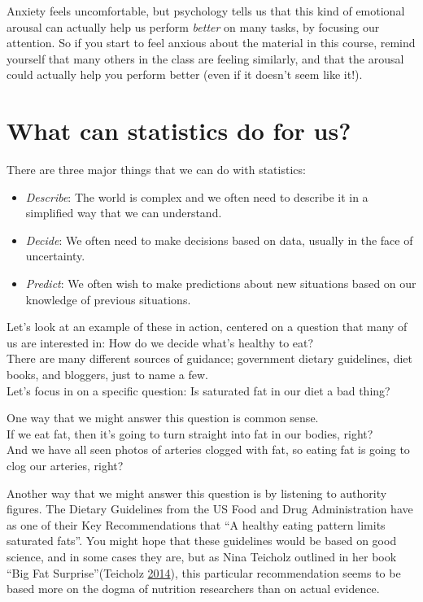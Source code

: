 \documentclass[12pt,]{book}
\providecommand{\tightlist}{%
  \setlength{\itemsep}{0pt}\setlength{\parskip}{0pt}}
\theoremstyle{definition}
\theoremstyle{definition}
\theoremstyle{definition}
\theoremstyle{remark}
\begin{document}
Anxiety feels uncomfortable, but psychology tells us that this kind of emotional arousal can actually help us perform \emph{better} on many tasks, by focusing our attention. So if you start to feel anxious about the material in this course, remind yourself that many others in the class are feeling similarly, and that the arousal could actually help you perform better (even if it doesn't seem like it!).

\hypertarget{what-can-statistics-do-for-us}{%
\section{What can statistics do for us?}\label{what-can-statistics-do-for-us}}

There are three major things that we can do with statistics:

\begin{itemize}
\tightlist
\item
  \emph{Describe}: The world is complex and we often need to describe it in a simplified way that we can understand.\\
\item
  \emph{Decide}: We often need to make decisions based on data, usually in the face of uncertainty.
\item
  \emph{Predict}: We often wish to make predictions about new situations based on our knowledge of previous situations.
\end{itemize}

Let's look at an example of these in action, centered on a question that many of us are interested in: How do we decide what's healthy to eat?\\
There are many different sources of guidance; government dietary guidelines, diet books, and bloggers, just to name a few.\\
Let's focus in on a specific question: Is saturated fat in our diet a bad thing?

One way that we might answer this question is common sense.\\
If we eat fat, then it's going to turn straight into fat in our bodies, right?\\
And we have all seen photos of arteries clogged with fat, so eating fat is going to clog our arteries, right?

Another way that we might answer this question is by listening to authority figures. The Dietary Guidelines from the US Food and Drug Administration have as one of their Key Recommendations that ``A healthy eating pattern limits saturated fats''. You might hope that these guidelines would be based on good science, and in some cases they are, but as Nina Teicholz outlined in her book ``Big Fat Surprise''(Teicholz \protect\hyperlink{ref-teic:2014}{2014}), this particular recommendation seems to be based more on the dogma of nutrition researchers than on actual evidence.
\end{document}
